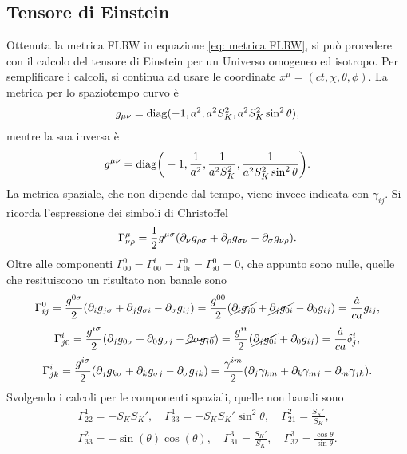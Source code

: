 \subsection{Tensore di Einstein}
Ottenuta la metrica FLRW in equazione \eqref{eq: metrica FLRW}, si può procedere con il calcolo del tensore di Einstein per un Universo omogeneo ed isotropo. Per semplificare i calcoli, si continua ad usare le coordinate $x^\mu = (ct,\chi,\theta,\phi)$. La metrica per lo spaziotempo curvo è
\begin{equation}
    g_{\mu\nu} = \mathrm{diag}{(-1,a^2,a^2S_K^2,a^2S_K^2\sin^2{\theta})},
\end{equation}
mentre la sua inversa è 
\begin{equation}
    g^{\mu\nu} = \mathrm{diag}{\bigg(-1,\frac{1}{a^2},\frac{1}{a^2S_K^2},\frac{1}{a^2S_K^2\sin^2{\theta}}\bigg)}.
\end{equation}
La metrica spaziale, che non dipende dal tempo, viene invece indicata con $\gamma_{ij}$. Si ricorda l'espressione dei simboli di Christoffel 
\begin{equation}
    \Gamma^\mu_{\nu\rho} = \frac{1}{2}g^{\mu\sigma}(\partial_\nu g_{\rho\sigma} + \partial_\rho g_{\sigma\nu} - \partial_\sigma g_{\nu\rho}).
\end{equation}
Oltre alle componenti $\Gamma^0_{00} = \Gamma^i_{00} = \Gamma^0_{0i} = \Gamma^0_{i0} = 0$, che appunto sono nulle, quelle che resituiscono un risultato non banale sono 
\begin{equation}
    \Gamma^0_{ij} = \frac{g^{0\sigma}}{2}(\partial_i g_{j\sigma} + \partial_j g_{\sigma i} - \partial_\sigma g_{ij}) = \frac{g^{00}}{2}(\cancel{\partial_i g_{j0}} + \cancel{\partial_j g_{0i}} - \partial_0 g_{ij}) = \frac{\dot{a}}{ca}g_{ij},
\end{equation}
\begin{equation}
    \Gamma^i_{j0} = \frac{g^{i\sigma}}{2}(\partial_j g_{0\sigma} + \partial_0g_{\sigma j} - \cancel{\partial\sigma g_{j0}}) = \frac{g^{ii}}{2}(\cancel{\partial_j g_{0i}} + \partial_0g_{ij}) = \frac{\dot{a}}{ca}\delta^i_j,
\end{equation}
\begin{equation}
    \Gamma^i_{jk} = \frac{g^{i\sigma}}{2}(\partial_j g_{k\sigma} + \partial_k g_{\sigma j} - \partial_\sigma g_{jk}) = \frac{\gamma^{im}}{2}(\partial_j \gamma_{km} + \partial_k\gamma_{mj} - \partial_m\gamma_{jk}).
\end{equation}
Svolgendo i calcoli per le componenti spaziali, quelle non banali sono 
\begin{align}
    \Gamma^1_{22} = -S_KS_K',\quad \Gamma^1_{33} = -S_KS_K'\sin^2{\theta},\quad \Gamma^2_{21} = \frac{S_K'}{S_K},\\
    \Gamma^2_{33} = -\sin{(\theta)}\cos{(\theta)},\quad \Gamma^3_{31} = \frac{S_K'}{S_K},\quad \Gamma^3_{32} = \frac{\cos{\theta}}{\sin{\theta}}.
\end{align}
